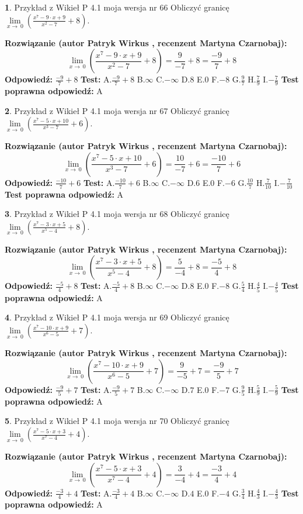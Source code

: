 \documentclass[12pt, a4paper]{article}
\theoremstyle{definition} %
\newtheorem{zad}{}
\newcommand{\zadStart}[1]{\begin{zad}#1\newline}
\newcommand{\zadStop}{\end{zad}}
\newcommand{\rozwStart}[2]{\noindent \textbf{Rozwiązanie (autor #1 , recenzent #2): }\newline}
\newcommand{\rozwStop}{\newline}
\newcommand{\odpStart}{\noindent \textbf{Odpowiedź:}\newline}
\newcommand{\odpStop}{\newline}
\newcommand{\testStart}{\noindent \textbf{Test:}\newline}
\newcommand{\testStop}{\newline}
\newcommand{\kluczStart}{\noindent \textbf{Test poprawna odpowiedź:}\newline}
\newcommand{\kluczStop}{\newline}
\begin{document}
\zadStart{Przykład z Wikieł P 4.1 moja wersja nr 66}
Obliczyć granicę $\lim\limits_{x\to\ 0}(\frac{x^{7}-9 \cdot x +9}{x^{2}-7}+8)$.
\zadStop
\rozwStart{Patryk Wirkus}{Martyna Czarnobaj}
$$\lim\limits_{x\to\ 0}(\frac{x^{7}-9 \cdot x +9}{x^{2}-7}+8)=\frac{9}{-7}+8=\frac{-9}{7}+8$$
\rozwStop
\odpStart
$\frac{-9}{7}+8$
\odpStop
\testStart
A.$\frac{-9}{7}+8$
B.$\infty$
C.$-\infty$
D.$8$
E.$0$
F.$-8$
G.$\frac{9}{7}$
H.$\frac{7}{9}$
I.$-\frac{7}{9}$
\testStop
\kluczStart
A
\kluczStop



\zadStart{Przykład z Wikieł P 4.1 moja wersja nr 67}
Obliczyć granicę $\lim\limits_{x\to\ 0}(\frac{x^{7}-5 \cdot x +10}{x^{3}-7}+6)$.
\zadStop
\rozwStart{Patryk Wirkus}{Martyna Czarnobaj}
$$\lim\limits_{x\to\ 0}(\frac{x^{7}-5 \cdot x +10}{x^{3}-7}+6)=\frac{10}{-7}+6=\frac{-10}{7}+6$$
\rozwStop
\odpStart
$\frac{-10}{7}+6$
\odpStop
\testStart
A.$\frac{-10}{7}+6$
B.$\infty$
C.$-\infty$
D.$6$
E.$0$
F.$-6$
G.$\frac{10}{7}$
H.$\frac{7}{10}$
I.$-\frac{7}{10}$
\testStop
\kluczStart
A
\kluczStop



\zadStart{Przykład z Wikieł P 4.1 moja wersja nr 68}
Obliczyć granicę $\lim\limits_{x\to\ 0}(\frac{x^{7}-3 \cdot x +5}{x^{5}-4}+8)$.
\zadStop
\rozwStart{Patryk Wirkus}{Martyna Czarnobaj}
$$\lim\limits_{x\to\ 0}(\frac{x^{7}-3 \cdot x +5}{x^{5}-4}+8)=\frac{5}{-4}+8=\frac{-5}{4}+8$$
\rozwStop
\odpStart
$\frac{-5}{4}+8$
\odpStop
\testStart
A.$\frac{-5}{4}+8$
B.$\infty$
C.$-\infty$
D.$8$
E.$0$
F.$-8$
G.$\frac{5}{4}$
H.$\frac{4}{5}$
I.$-\frac{4}{5}$
\testStop
\kluczStart
A
\kluczStop



\zadStart{Przykład z Wikieł P 4.1 moja wersja nr 69}
Obliczyć granicę $\lim\limits_{x\to\ 0}(\frac{x^{7}-10 \cdot x +9}{x^{6}-5}+7)$.
\zadStop
\rozwStart{Patryk Wirkus}{Martyna Czarnobaj}
$$\lim\limits_{x\to\ 0}(\frac{x^{7}-10 \cdot x +9}{x^{6}-5}+7)=\frac{9}{-5}+7=\frac{-9}{5}+7$$
\rozwStop
\odpStart
$\frac{-9}{5}+7$
\odpStop
\testStart
A.$\frac{-9}{5}+7$
B.$\infty$
C.$-\infty$
D.$7$
E.$0$
F.$-7$
G.$\frac{9}{5}$
H.$\frac{5}{9}$
I.$-\frac{5}{9}$
\testStop
\kluczStart
A
\kluczStop



\zadStart{Przykład z Wikieł P 4.1 moja wersja nr 70}
Obliczyć granicę $\lim\limits_{x\to\ 0}(\frac{x^{7}-5 \cdot x +3}{x^{7}-4}+4)$.
\zadStop
\rozwStart{Patryk Wirkus}{Martyna Czarnobaj}
$$\lim\limits_{x\to\ 0}(\frac{x^{7}-5 \cdot x +3}{x^{7}-4}+4)=\frac{3}{-4}+4=\frac{-3}{4}+4$$
\rozwStop
\odpStart
$\frac{-3}{4}+4$
\odpStop
\testStart
A.$\frac{-3}{4}+4$
B.$\infty$
C.$-\infty$
D.$4$
E.$0$
F.$-4$
G.$\frac{3}{4}$
H.$\frac{4}{3}$
I.$-\frac{4}{3}$
\testStop
\kluczStart
A
\kluczStop
\end{document}
